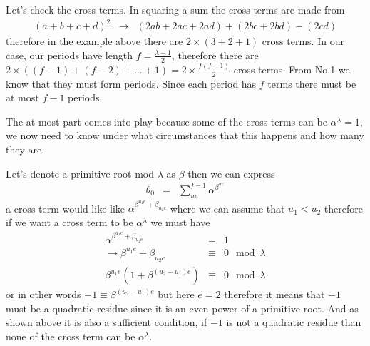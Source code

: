 \documentclass[aps,preprint,preprintnumbers,nofootinbib,showpacs,prd]{revtex4-1}
\newcommand{\nbea}{\begin{eqnarray*}}
\newcommand{\neea}{\end{eqnarray*}}
\begin{document}
\begin{enumerate}
Let's check the cross terms. In squaring a sum the cross terms are made from
%
\nbea
(a + b+ c + d)^2 & \to & (2ab + 2ac + 2ad) + (2bc + 2bd) + (2cd)
\neea
%
therefore in the example above there are $2\times(3 + 2 + 1)$ cross terms. In our case, our periods have length $f = \frac{\lambda - 1}{2}$, therefore there are $2\times((f-1) + (f - 2) + \dots + 1) = 2\times\frac{f(f-1)}{2}$ cross terms. From No.1 we know that they must form periods. Since each period has $f$ terms there must be at most $f-1$ periods.

The at most part comes into play because some of the cross terms can be $\alpha^\lambda = 1$, we now need to know under what circumstances that this happens and how many they are.

Let's denote a primitive root mod $\lambda$ as $\beta$ then we can express
%
\nbea
\theta_0 & = & \sum_{ue}^{f-1} \alpha^{\beta^{ue}}
\neea
%
a cross term would like like $\alpha^{\beta^{u_1 e} + \beta_{u_2 e}}$ where we can assume that $u_1 < u_2$ therefore if we want a cross term to be $\alpha^\lambda$ we must have
%
\nbea
\alpha^{\beta^{u_1 e} + \beta_{u_2 e}} & = & 1 \\
\to \beta^{u_1 e} + \beta_{u_2 e} & \equiv & 0 \mod{\lambda} \\
\beta^{u_1e}(1 + \beta^{(u_2 - u_1) e}) & \equiv & 0 \mod{\lambda}
\neea
%
or in other words $-1 \equiv \beta^{(u_2 - u_1) e}$ but here $e = 2$ therefore it means that $-1$ must be a quadratic residue since it is an even power of a primitive root. And as shown above it is also a sufficient condition, if $-1$ is not a quadratic residue than none of the cross term can be $\alpha^\lambda$.


\end{enumerate}
\end{document}
